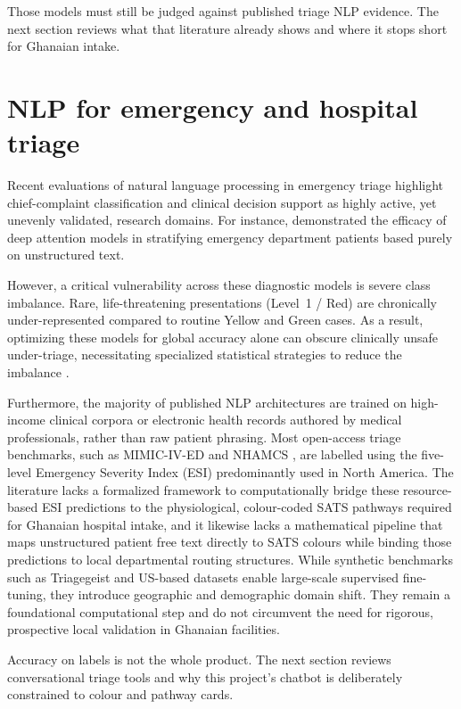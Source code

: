 Those models must still be judged against published triage NLP evidence. The next section reviews what that literature already shows and where it stops short for Ghanaian intake.

\section{NLP for emergency and hospital triage}

Recent evaluations of natural language processing in emergency triage highlight chief-complaint classification and clinical decision support as highly active, yet unevenly validated, research domains. For instance, \citet{gligorijevic2018deep} demonstrated the efficacy of deep attention models in stratifying emergency department patients based purely on unstructured text.

However, a critical vulnerability across these diagnostic models is severe class imbalance. Rare, life-threatening presentations (Level~1 / Red) are chronically under-represented compared to routine Yellow and Green cases. As a result, optimizing these models for global accuracy alone can obscure clinically unsafe under-triage, necessitating specialized statistical strategies to reduce the imbalance \citep{Berkowitz2019,chawla2002smote}.

Furthermore, the majority of published NLP architectures are trained on high-income clinical corpora or electronic health records authored by medical professionals, rather than raw patient phrasing. Most open-access triage benchmarks, such as MIMIC-IV-ED \citep{mimicived2023} and NHAMCS \citep{nhamcs201822}, are labelled using the five-level Emergency Severity Index (ESI) predominantly used in North America. The literature lacks a formalized framework to computationally bridge these resource-based ESI predictions to the physiological, colour-coded SATS pathways required for Ghanaian hospital intake, and it likewise lacks a mathematical pipeline that maps unstructured patient free text directly to SATS colours while binding those predictions to local departmental routing structures. While synthetic benchmarks such as Triagegeist \citep{triagegeist2025} and US-based datasets enable large-scale supervised fine-tuning, they introduce geographic and demographic domain shift. They remain a foundational computational step and do not circumvent the need for rigorous, prospective local validation in Ghanaian facilities.

Accuracy on labels is not the whole product. The next section reviews conversational triage tools and why this project's chatbot is deliberately constrained to colour and pathway cards.

